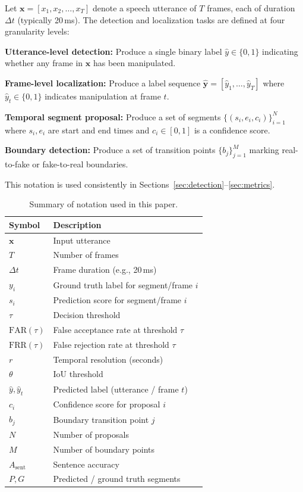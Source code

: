 \documentclass[journal]{IEEEtran}
\begin{document}
Let $\mathbf{x} = [x_1, x_2, \ldots, x_T]$ denote a speech utterance of $T$ frames, each of duration $\Delta t$ (typically 20\,ms). The detection and localization tasks are defined at four granularity levels:

\textbf{Utterance-level detection:} Produce a single binary label $\hat{y} \in \{0, 1\}$ indicating whether any frame in $\mathbf{x}$ has been manipulated.

\textbf{Frame-level localization:} Produce a label sequence $\hat{\mathbf{y}} = [\hat{y}_1, \ldots, \hat{y}_T]$ where $\hat{y}_t \in \{0, 1\}$ indicates manipulation at frame $t$.

\textbf{Temporal segment proposal:} Produce a set of segments $\{(s_i, e_i, c_i)\}_{i=1}^{N}$ where $s_i, e_i$ are start and end times and $c_i \in [0,1]$ is a confidence score.

\textbf{Boundary detection:} Produce a set of transition points $\{b_j\}_{j=1}^{M}$ marking real-to-fake or fake-to-real boundaries.

This notation is used consistently in Sections~\ref{sec:detection}--\ref{sec:metrics}.

\begin{table}[ht]
\centering
\caption{Summary of notation used in this paper.}
\label{tab:notation}
\small
\begin{tabular}{ll}
\toprule
\textbf{Symbol} & \textbf{Description} \\
\midrule
$\mathbf{x}$ & Input utterance \\
$T$ & Number of frames \\
$\Delta t$ & Frame duration (e.g., 20\,ms) \\
$y_i$ & Ground truth label for segment/frame $i$ \\
$s_i$ & Prediction score for segment/frame $i$ \\
$\tau$ & Decision threshold \\
$\text{FAR}(\tau)$ & False acceptance rate at threshold $\tau$ \\
$\text{FRR}(\tau)$ & False rejection rate at threshold $\tau$ \\
$r$ & Temporal resolution (seconds) \\
$\theta$ & IoU threshold \\
$\hat{y}, \hat{y}_t$ & Predicted label (utterance / frame $t$) \\
$c_i$ & Confidence score for proposal $i$ \\
$b_j$ & Boundary transition point $j$ \\
$N$ & Number of proposals \\
$M$ & Number of boundary points \\
$A_\text{sent}$ & Sentence accuracy \\
$P, G$ & Predicted / ground truth segments \\
\bottomrule
\end{tabular}
\end{table}
\end{document}
